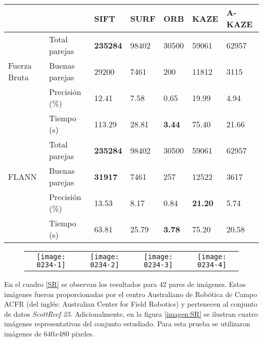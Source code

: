 \begin{table}[h]
	\centering
	\label{0234-2}
	\renewcommand{\arraystretch}{0.8}%
	\begin{tabular}{@{}lllllll@{}}
		\toprule
		&                				& SIFT 			& SURF & ORB 			& KAZE 				& A-KAZE \\ \midrule 
		\hfill\vline& Total parejas  & \textbf{235284}  & 98402&30500			& 59061 			& 62957   \\
		Fuerza Bruta \vline& Buenas parejas & 29200		& 7461 & 200 			& 11812 			& 3115    \\
		\hfill\vline& Precisión (\%) & 12.41			&7.58 &0.65 			&19.99 				& 4.94  \\
		\vspace{0.3cm}
		\hfill\vline& Tiempo (s)     & 113.29			&28.81 &\textbf{3.44}	&75.40 				& 21.66  \\
		
		\hfill\vline& Total parejas  & \textbf{235284}  & 98402&30500			& 59061 			& 62957   \\
		FLANN \hfill\vline& Buenas parejas &\textbf{31917}& 7461 & 257 			& 12522				& 3617     \\ 
		\hfill\vline& Precisión (\%) & 13.53			& 8.17& 0.84			& \textbf{21.20}	& 5.74 \\ 
		\hfill\vline& Tiempo (s)     & 63.81			&25.79 &\textbf{3.78} 	&75.20 				& 20.58  \\
		\bottomrule
	\end{tabular}
\end{table}

\begin{figure}[h]
	
	\centering
	\vspace{0.6cm}
	\begin{tabular}{@{}cccc@{}}
		\texttt{[image: 0234-1]} &
		\texttt{[image: 0234-2]} &
		\texttt{[image: 0234-3]} &
		\texttt{[image: 0234-4]} 
	\end{tabular}
	\label{imagen:0234}
\end{figure}


En el cuadro \ref{SR} se observan los resultados para 42 pares de imágenes. Estas imágenes fueron proporcionadas por el centro Australiano de Robótica de Campo ACFR (del inglés: Australian Center for Field Robotics) y pertenecen al conjunto de datos \textit{ScottReef 25}. Adicionalmente, en la figura \ref{imagen:SR} se ilustran cuatro imágenes representativas del conjunto estudiado. Para esta prueba se utilizaron imágenes de $640x480$ píxeles.

